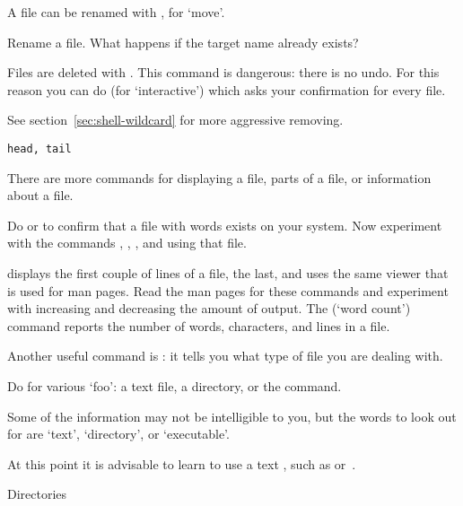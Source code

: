 A file can be renamed with , for `move'.

\begin{exercise}
  Rename a file. What happens if the target name already exists?
\end{exercise}


Files are deleted with . This command is dangerous: there is no
undo.
For this reason you can do  (for `interactive') which
asks your confirmation for every file.

See section~\ref{sec:shell-wildcard} for more aggressive removing.

 {\texttt{head, tail}}

There are more commands for displaying a file, parts of a file, or
information about a file. 

\begin{exercise}
  Do  or  to
  confirm that a file with words exists on your system. Now experiment
  with the commands , , , and  using
  that file.
\end{exercise}
\begin{outcome}
   displays the first couple of lines of a file,
   the last, and  uses the
  same viewer that is used for man pages. Read the man pages for these
  commands and experiment with increasing and decreasing the amount of
  output.  The  (`word count') command reports the
  number of words, characters, and lines in a file.
\end{outcome}

Another useful command is : it tells you what
type of file you are dealing with.

\begin{exercise}
  Do  for various `foo': a text file, a directory, or the
   command.
\end{exercise}
\begin{outcome}
  Some of the information may not be intelligible to you, but the
  words to look out for are `text', `directory', or `executable'.
\end{outcome}

At this point it is advisable to learn to use a text
, such as  or~.

 {Directories}

